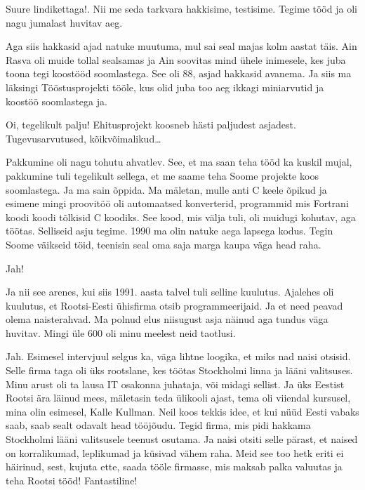 
Suure lindikettaga!. Nii me seda tarkvara hakkisime, testisime. Tegime tööd ja 
oli nagu jumalast huvitav aeg.

Aga siis hakkasid ajad natuke muutuma, mul sai seal majas kolm aastat täis. Ain 
Rasva oli muide tollal sealsamas ja Ain soovitas mind 
ühele inimesele, kes juba toona tegi koostööd soomlastega. See oli 88, asjad 
hakkasid avanema. Ja siis ma läksingi Tööstusprojekti 
tööle, kus  olid juba too aeg ikkagi miniarvutid ja koostöö soomlastega ja. 


Oi, tegelikult palju! Ehitusprojekt koosneb  hästi paljudest asjadest. 
Tugevusarvutused, kõikvõimalikud\ldots 


Pakkumine oli nagu tohutu ahvatlev. See, et ma saan teha tööd ka kuskil mujal, 
pakkumine tuli tegelikult sellega, et me saame teha Soome projekte koos 
soomlastega. Ja ma sain õppida. Ma mäletan, mulle anti C keele õpikud ja 
esimene mingi proovitöö oli automaatsed konverterid,  programmid mis  
Fortrani koodi koodi tõlkisid C koodiks. See kood, mis 
välja tuli, oli muidugi kohutav, aga töötas. Selliseid asju tegime. 1990 ma 
olin natuke aega lapsega kodus. Tegin Soome väikseid töid, teenisin seal oma 
saja marga kaupa  väga head raha. 


Jah!

Ja nii see arenes, kui siis 1991. aasta talvel tuli selline kuulutus. Ajalehes 
oli kuulutus, et Rootsi-Eesti ühisfirma otsib programmeerijaid. Ja et need 
peavad olema naisterahvad. Ma polnud elus niisugust asja näinud aga tundus väga 
huvitav. Mingi üle 600 oli minu meelest neid taotlusi. 


Jah. Esimesel intervjuul selgus ka, väga lihtne loogika, et miks nad naisi 
otsisid. Selle firma taga oli üks rootslane, kes töötas Stockholmi linna ja 
lääni valitsuses. Minu arust oli ta lausa IT osakonna juhataja, või midagi 
sellist. Ja  üks Eestist Rootsi ära läinud mees, mäletasin teda ülikooli ajast, 
tema oli viiendal kursusel, mina olin esimesel, Kalle 
Kullman. Neil koos tekkis idee, et kui nüüd Eesti 
vabaks saab, saab sealt odavalt head tööjõudu. Tegid firma, mis pidi hakkama 
Stockholmi lääni valitsusele teenust osutama. Ja naisi otsiti selle pärast, et 
naised on korralikumad, leplikumad ja küsivad vähem raha. Meid see too hetk 
eriti ei häirinud, sest, kujuta ette, saada tööle firmasse, mis maksab palka 
valuutas ja teha Rootsi tööd! Fantastiline!


